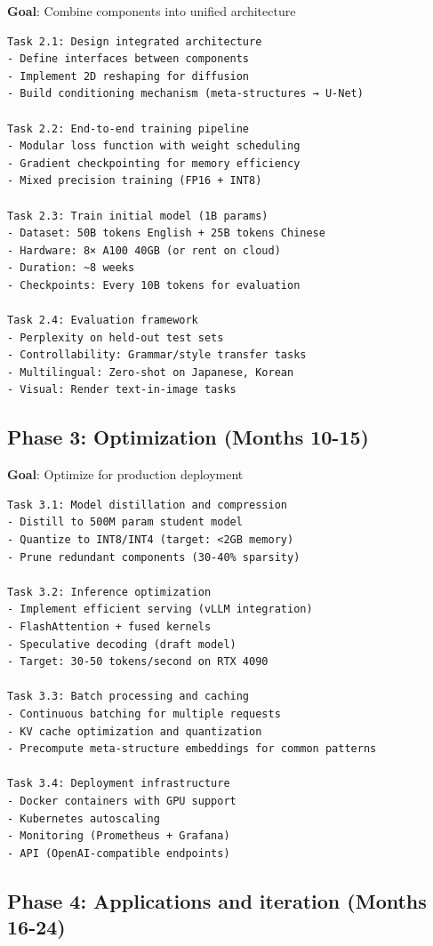 \documentclass[11pt]{article}
\begin{document}
\textbf{Goal}: Combine components into unified architecture

\begin{verbatim}
Task 2.1: Design integrated architecture
- Define interfaces between components
- Implement 2D reshaping for diffusion
- Build conditioning mechanism (meta-structures → U-Net)

Task 2.2: End-to-end training pipeline
- Modular loss function with weight scheduling
- Gradient checkpointing for memory efficiency
- Mixed precision training (FP16 + INT8)

Task 2.3: Train initial model (1B params)
- Dataset: 50B tokens English + 25B tokens Chinese
- Hardware: 8× A100 40GB (or rent on cloud)
- Duration: ~8 weeks
- Checkpoints: Every 10B tokens for evaluation

Task 2.4: Evaluation framework
- Perplexity on held-out test sets
- Controllability: Grammar/style transfer tasks
- Multilingual: Zero-shot on Japanese, Korean
- Visual: Render text-in-image tasks
\end{verbatim}

\subsection{Phase 3: Optimization (Months 10-15)}

\textbf{Goal}: Optimize for production deployment

\begin{verbatim}
Task 3.1: Model distillation and compression
- Distill to 500M param student model
- Quantize to INT8/INT4 (target: <2GB memory)
- Prune redundant components (30-40% sparsity)

Task 3.2: Inference optimization
- Implement efficient serving (vLLM integration)
- FlashAttention + fused kernels
- Speculative decoding (draft model)
- Target: 30-50 tokens/second on RTX 4090

Task 3.3: Batch processing and caching
- Continuous batching for multiple requests
- KV cache optimization and quantization
- Precompute meta-structure embeddings for common patterns

Task 3.4: Deployment infrastructure
- Docker containers with GPU support
- Kubernetes autoscaling
- Monitoring (Prometheus + Grafana)
- API (OpenAI-compatible endpoints)
\end{verbatim}

\subsection{Phase 4: Applications and iteration (Months 16-24)}
\end{document}
